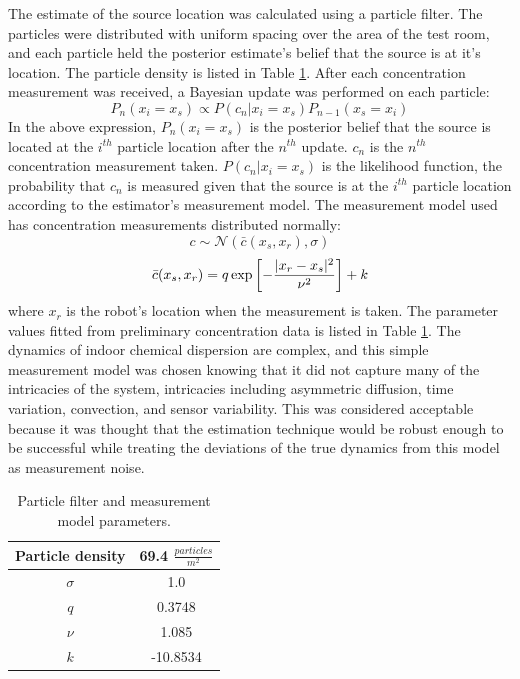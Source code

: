 \documentclass[submit, 12pt]{aiaa-pretty-modified}
\begin{document}
The estimate of the source location was calculated using a particle
filter\cite{maskell2001tutorial}. The particles were distributed with uniform
spacing over the area of the test room, and each particle held the posterior
estimate's belief that the source is at it's location. The particle density is listed in Table
\ref{tab:estimator-parameters}. After each concentration measurement was
received, a Bayesian update was performed on each particle: 
\[P_n(x_i = x_s) \propto P(c_n | x_i = x_s) P_{n-1}(x_s = x_i)\]
In the above expression, $P_n(x_i = x_s)$ is the posterior belief that the source is located at the
$i^{th}$ particle location after the $n^{th}$ update. $c_n$ is the $n^{th}$ concentration
measurement taken. $P(c_n | x_i = x_s)$ is the likelihood function, the probability that $c_n$ is
measured given that the source is at the $i^{th}$ particle location according to
the estimator's measurement model. The measurement model used has concentration
measurements distributed normally: 
\[c \sim \mathcal{N}\left(\bar{c}(x_s,x_r), \sigma \right)\]
\[\bar{c}(x_s,x_r) = q \exp{\left[-\frac{\lvert x_r - x_s\rvert^2}{\nu^2}\right]} + k\]
where $x_r$ is the robot's location when the measurement is taken. The parameter
values fitted from preliminary concentration data is listed in Table
\ref{tab:estimator-parameters}. The dynamics of indoor chemical dispersion are
complex, and this simple measurement model was chosen knowing that it did not
capture many of the intricacies of the system, intricacies including asymmetric
diffusion, time variation, convection, and sensor variability. This was
considered acceptable because it was thought that the estimation technique would
be robust enough to be successful while treating the deviations of the true
dynamics from this model as measurement noise.

\begin{table}
\caption[Estimator parameters]{Particle filter and measurement model parameters.}
\begin{center}
\begin{tabular}{|c|c|}
\hline
Particle density & 69.4 $\frac{particles}{m^2}$ \\ \hline
$\sigma$ & 1.0 \\ \hline
$q$ & 0.3748 \\ \hline
$\nu$ & 1.085  \\ \hline
$k$ & -10.8534  \\ \hline
\end{tabular}
\end{center}
\label{tab:estimator-parameters}
\end{table}
\end{document}
